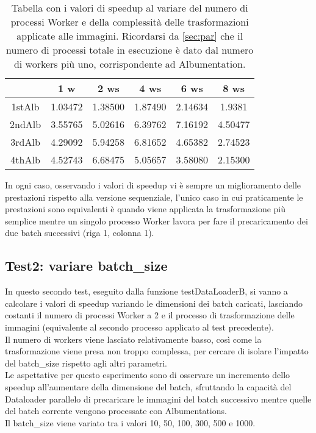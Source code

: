 \documentclass[10pt,twocolumn,letterpaper]{article}
\begin{document}
\begin{table}[h]
\centering
\begin{tabular}{ |c|c|c|c|c|c| } 
\hline
 & 1 w & 2 ws & 4 ws & 6 ws & 8 ws\\
 \hline
1stAlb & 1.03472 & 1.38500 & 1.87490 & 2.14634 & 1.9381\\
\hline
2ndAlb & 3.55765 & 5.02616 & 6.39762 & 7.16192 & 4.50477\\
\hline
3rdAlb & 4.29092 & 5.94258 & 6.81652 & 4.65382 & 2.74523\\
\hline
4thAlb & 4.52743 & 6.68475 & 5.05657 & 3.58080 & 2.15300\\
\hline
\end{tabular}
\vspace*{3mm}
\caption{Tabella con i valori di speedup al variare del numero di processi Worker e della complessità delle trasformazioni applicate alle immagini. Ricordarsi da \cref{sec:par} che il numero di processi totale in esecuzione è dato dal numero di workers più uno, corrispondente ad Albumentation.}
\label{table:t1}
\end{table}

In ogni caso, osservando i valori di speedup vi è sempre un miglioramento delle prestazioni rispetto alla versione sequenziale, l'unico caso in cui praticamente le prestazioni sono equivalenti è quando viene applicata la trasformazione più semplice mentre un singolo processo Worker lavora per fare il precaricamento dei due batch successivi (riga 1, colonna 1).

\subsection{Test2: variare batch\_size}

In questo secondo test, eseguito dalla funzione testDataLoaderB, si vanno a calcolare i valori di speedup variando le dimensioni dei batch caricati, lasciando costanti il numero di processi Worker a 2 e il processo di trasformazione delle immagini (equivalente al secondo processo applicato al test precedente).\\
Il numero di workers viene lasciato relativamente basso, così come la trasformazione viene presa non troppo complessa, per cercare di isolare l'impatto del batch\_size rispetto agli altri parametri.\\
Le aspettative per questo esperimento sono di osservare un incremento dello speedup all'aumentare della dimensione del batch, sfruttando la capacità del Dataloader parallelo di precaricare le immagini del batch successivo mentre quelle del batch corrente vengono processate con Albumentations.\\
Il batch\_size viene variato tra i valori 10, 50, 100, 300, 500 e 1000.
\end{document}
